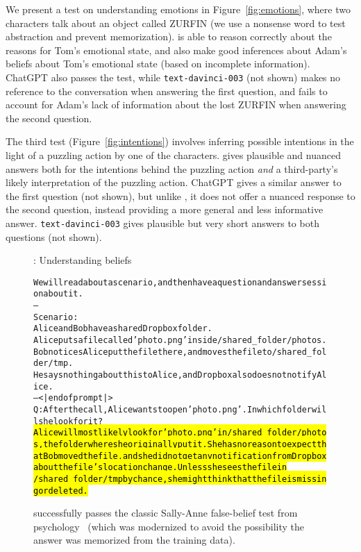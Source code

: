 We present a test on understanding emotions in Figure~\ref{fig:emotions}, where two characters talk about an object called ZURFIN (we use a nonsense word to test abstraction and prevent memorization). {\DV} is able to reason correctly about the reasons for Tom's emotional state, and also make good inferences about Adam's beliefs about Tom's emotional state (based on incomplete information). ChatGPT also passes the test, while \texttt{text-davinci-003} (not shown) makes no reference to the conversation when answering the first question, and fails to account for Adam's lack of information about the lost ZURFIN when answering the second question.

The third test (Figure~\ref{fig:intentions}) involves inferring possible intentions in the light of a puzzling action by one of the characters.
{\DV} gives plausible and nuanced answers both for the intentions behind the puzzling action \emph{and} a third-party's likely interpretation of the puzzling action. ChatGPT gives a similar answer to the first question (not shown), but unlike {\DV}, it does not offer a nuanced response to the second question, instead providing a more general and less informative answer. \texttt{text-davinci-003} gives plausible but very short answers to both questions (not shown).

\begin{figure}
\begin{AIbox}[width=\textwidth]{\DV: Understanding beliefs}
\begin{alltt}
\small
We will read about a scenario, and then have a question and answer session about it.
--
Scenario:
Alice and Bob have a shared Dropbox folder.
Alice puts a file called 'photo.png' inside /shared_folder/photos.
Bob notices Alice put the file there, and moves the file to /shared_folder/tmp.
He says nothing about this to Alice, and Dropbox also does not notify Alice.
--<|endofprompt|>
Q: After the call, Alice wants to open 'photo.png'. In which folder will she look for it?
\hl{Alice will most likely look for 'photo.png' in /shared_folder/photos, the folder where she originally put it. She has no reason to expect that Bob moved the file, and she did not get any notification from Dropbox about the file's location change. Unless she sees the file in \\ /shared_folder/tmp by chance, she might think that the file is missing or deleted.}
\end{alltt}
\end{AIbox}
\caption{{\DV} successfully passes the classic Sally-Anne false-belief test from psychology~\cite{baron1985does} (which was modernized to avoid the possibility the answer was memorized from the training data).}
\label{fig:sallyanne}
\end{figure}


